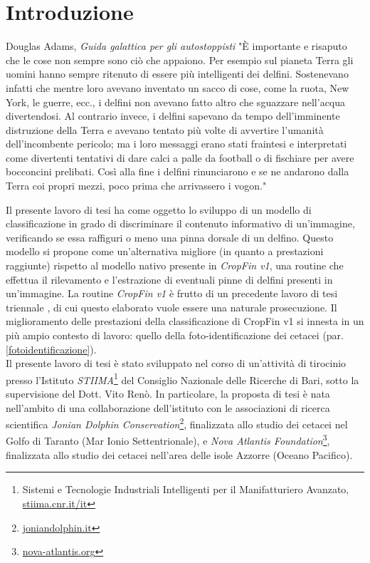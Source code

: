 \pagestyle{fancy}
\fancyhf{}
\fancyhead[OL]{\rightmark}
\cfoot{\thepage}

\chapter{Introduzione}
\label{introduzione}

\begin{chapquote}{Douglas Adams, \textit{Guida galattica per gli autostoppisti}}
"È importante e risaputo che le cose non sempre sono ciò che appaiono. Per esempio sul pianeta Terra gli uomini hanno sempre ritenuto di essere più intelligenti dei delfini. Sostenevano infatti che mentre loro avevano inventato un sacco di cose, come la ruota, New York, le guerre, ecc., i delfini non avevano fatto altro che sguazzare nell'acqua divertendosi. Al contrario invece, i delfini sapevano da tempo dell'imminente distruzione della Terra e avevano tentato più volte di avvertire l'umanità dell'incombente pericolo; ma i loro messaggi erano stati fraintesi e interpretati come divertenti tentativi di dare calci a palle da football o di fischiare per avere bocconcini prelibati. Così alla fine i delfini rinunciarono e se ne andarono dalla Terra coi propri mezzi, poco prima che arrivassero i vogon."
\end{chapquote}
\vspace{5mm}

Il presente lavoro di tesi ha come oggetto lo sviluppo di un modello di classificazione in grado di discriminare il contenuto informativo di un'immagine, verificando se essa raffiguri o meno una pinna dorsale di un delfino. Questo modello si propone come un'alternativa migliore (in quanto a prestazioni raggiunte) rispetto al modello nativo presente in \textit{CropFin v1}, una routine che effettua il rilevamento e l'estrazione di eventuali pinne di delfini presenti in un'immagine. La routine \textit{CropFin v1} è frutto di un precedente lavoro di tesi triennale \cite{gianvito}, di cui questo elaborato vuole essere una naturale prosecuzione.
Il miglioramento delle prestazioni della classificazione di CropFin v1 si innesta in un più ampio contesto di lavoro: quello della foto-identificazione dei cetacei (par. \ref{fotoidentificazione}).\\

Il presente lavoro di tesi è stato sviluppato nel corso di un'attività di tirocinio presso l'Istituto \textit{STIIMA}\footnote{Sistemi e Tecnologie Industriali Intelligenti per il Manifatturiero Avanzato, \url{stiima.cnr.it/it}} del Consiglio Nazionale delle Ricerche di Bari, sotto la supervisione del Dott. Vito Renò.
In particolare, la proposta di tesi è nata nell'ambito di una collaborazione dell'istituto con le associazioni di ricerca scientifica \textit{Jonian Dolphin Conservation}\footnote{\url{joniandolphin.it}}, finalizzata allo studio dei cetacei nel Golfo di Taranto (Mar Ionio Settentrionale), e \textit{Nova Atlantis Foundation}\footnote{\url{nova-atlantis.org}}, finalizzata allo studio dei cetacei nell'area delle isole Azzorre (Oceano Pacifico).

